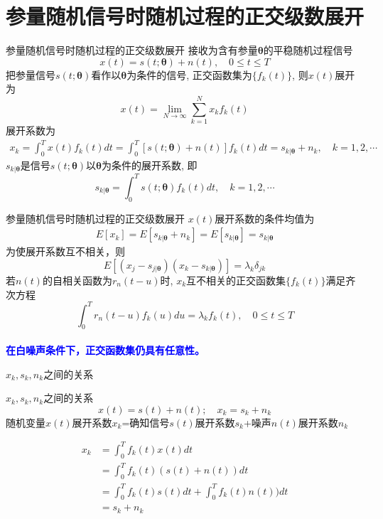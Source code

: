 \section{参量随机信号时随机过程的正交级数展开}

\begin{frame}[shrink]{参量随机信号时随机过程的正交级数展开}
接收为含有参量$\bm{\theta}$的平稳随机过程信号
\[x(t)=s(t; \bm{\theta})+n(t),\quad 0\le t\le T \]
把参量信号$s(t; \bm{\theta})$看作以$\bm{\theta}$为条件的信号, 正交函数集为$\{f_k(t)\}$, 则$x(t)$展开为
\[x(t)=\lim\limits_{N\to\infty}\sum_{k=1}^{N}x_kf_k(t) \]
展开系数为
\begin{align*}
x_k=\int_{0}^{T}x(t)f_k(t)dt=\int_{0}^{T}[s(t; \bm{\theta})+n(t)]f_k(t)dt=s_{k|\bm{\theta}}+n_k,\quad k=1,2,\cdots
\end{align*}
$s_{k|\bm{\theta}}$是信号$s(t; \bm{\theta})$以$\bm{\theta}$为条件的展开系数, 即
\[s_{k|\bm{\theta}}=\int_{0}^{T}s(t; \bm{\theta})f_k(t)dt,\quad  k=1,2,\cdots \]
\end{frame}

\begin{frame}[shrink]{参量随机信号时随机过程的正交级数展开}
$x(t)$展开系数的条件均值为
\begin{align*}
E[x_k]=E[s_{k|\bm{\theta}}+n_k]=E[s_{k|\bm{\theta}}]=s_{k|\bm{\theta}}
\end{align*}
为使展开系数互不相关，则
\[E[(x_j-s_{j|\bm{\theta}})(x_k-s_{k|\bm{\theta}})]=\lambda_k\delta_{jk} \]
若$n(t)$的自相关函数为$r_n(t-u)$时, $x_k$互不相关的正交函数集$\{f_k(t)\}$满足齐次方程
\[\int_{0}^{T}r_n(t-u)f_k(u)du=\lambda_kf_k(t), \quad 0\le t\le T \]
~\\
\textbf{\textcolor{blue}{在白噪声条件下，正交函数集仍具有任意性。}}
\end{frame}

\begin{frame}{$x_k,s_k,n_k$之间的关系}
\begin{block}{$x_k,s_k,n_k$之间的关系}
	\[x(t)=s(t)+n(t); \quad x_k=s_k+n_k \]
	随机变量$x(t)$展开系数$x_k$=确知信号$s(t)$展开系数$s_k$+噪声$n(t)$展开系数$n_k$
\end{block}
\begin{align*}
x_k&=\int_{0}^{T}f_k(t)x(t)dt\\
&=\int_{0}^{T}f_k(t)(s(t)+n(t))dt\\
&=\int_{0}^{T}f_k(t)s(t)dt+\int_{0}^{T}f_k(t)n(t))dt\\
&=s_k+n_k
\end{align*}
\end{frame}

